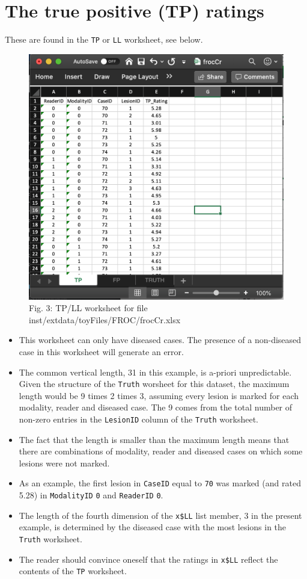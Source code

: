 \documentclass[
]{book}
\providecommand{\tightlist}{%
  \setlength{\itemsep}{0pt}\setlength{\parskip}{0pt}}
\begin{document}
\hypertarget{the-true-positive-tp-ratings-1}{%
\section{The true positive (TP) ratings}\label{the-true-positive-tp-ratings-1}}

These are found in the \texttt{TP} or \texttt{LL} worksheet, see below.

\begin{figure}

{\centering \includegraphics[width=0.5\linewidth,height=0.2\textheight]{images/frocCrLL} 

}

\caption{Fig. 3: TP/LL worksheet for file inst/extdata/toyFiles/FROC/frocCr.xlsx}\label{fig:frocCrLL}
\end{figure}

\begin{itemize}
\tightlist
\item
  This worksheet can only have diseased cases. The presence of a non-diseased case in this worksheet will generate an error.
\item
  The common vertical length, 31 in this example, is a-priori unpredictable. Given the structure of the \texttt{Truth} worsheet for this dataset, the maximum length would be 9 times 2 times 3, assuming every lesion is marked for each modality, reader and diseased case. The 9 comes from the total number of non-zero entries in the \texttt{LesionID} column of the \texttt{Truth} worksheet.
\item
  The fact that the length is smaller than the maximum length means that there are combinations of modality, reader and diseased cases on which some lesions were not marked.
\item
  As an example, the first lesion in \texttt{CaseID} equal to \texttt{70} was marked (and rated 5.28) in \texttt{ModalityID} \texttt{0} and \texttt{ReaderID} \texttt{0}.
\item
  The length of the fourth dimension of the \texttt{x\$LL} list member, 3 in the present example, is determined by the diseased case with the most lesions in the \texttt{Truth} worksheet.
\item
  The reader should convince oneself that the ratings in \texttt{x\$LL} reflect the contents of the \texttt{TP} worksheet.
\end{itemize}
\end{document}

